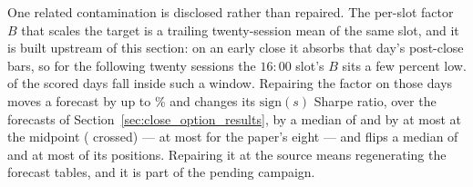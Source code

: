 One related contamination is disclosed rather than repaired. The per-slot
factor $B$ that scales the target is a trailing twenty-session mean of the
same slot, and it is built upstream of this section: on an early close it
absorbs that day's post-close bars, so
for the following twenty sessions the $16{:}00$ slot's $B$ sits a few
percent low. \cmBContamDays{} of the \cmNdays{} scored days fall inside such a window.
Repairing the factor on those days moves a forecast by up to \cmBContamMaxRel\% and %
changes its $\mathrm{sign}(s)$ Sharpe ratio, over the forecasts of
Section~\ref{sec:close_option_results}, by a median of \cmBContamMedDSh{} and by at most
\cmBContamMaxDSh{} at the midpoint (\cmBContamMaxDShX{} crossed) --- at most
\cmBContamPaperMaxDSh{} for the paper's eight --- and flips a median of
\cmBContamMedFlips{} and at most \cmBContamMaxFlips{} of its positions.
Repairing it at the source means regenerating the forecast
tables, and it is part of the pending campaign.


